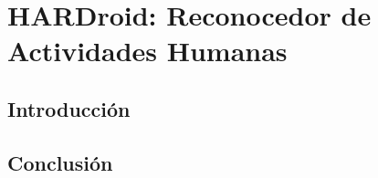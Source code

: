 
\chapter{HARDroid: Reconocedor de Actividades Humanas}

\label{chap5:hardroid}

\section{Introducción}

\section{Conclusión}
